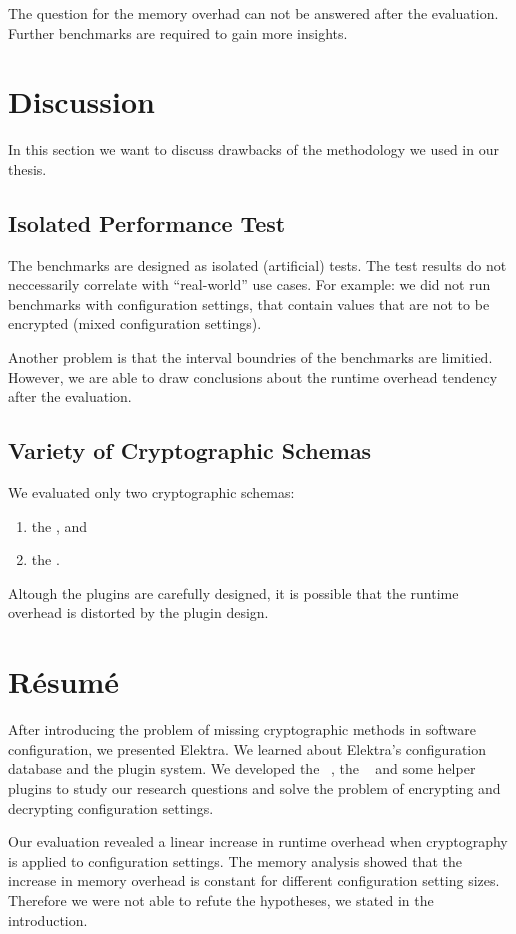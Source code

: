 The question for the memory overhad can not be answered after the evaluation.
Further benchmarks are required to gain more insights.

\section{Discussion}

In this section we want to discuss drawbacks of the methodology we used in our thesis.

	\subsection{Isolated Performance Test}

The benchmarks are designed as isolated (artificial) tests.
The test results do not neccessarily correlate with ``real-world'' use cases.
For example: we did not run benchmarks with configuration settings, that contain values that are not to be encrypted (mixed configuration settings).

Another problem is that the interval boundries of the benchmarks are limitied.
However, we are able to draw conclusions about the runtime overhead tendency after the evaluation.

	\subsection{Variety of Cryptographic Schemas}

We evaluated only two cryptographic schemas:
\begin{enumerate}
\item the \crypto, and
\item the \fcrypt.
\end{enumerate}

Altough the plugins are carefully designed, it is possible that the runtime overhead is distorted by the plugin design.

\section{Résumé}

After introducing the problem of missing cryptographic methods in software configuration, we presented Elektra.
We learned about Elektra's configuration database and the plugin system.
We developed the \crypto~, the \fcrypt~ and some helper plugins to study our research questions and solve the problem of encrypting and decrypting configuration settings.

Our evaluation revealed a linear increase in runtime overhead when cryptography is applied to configuration settings.
The memory analysis showed that the increase in memory overhead is constant for different configuration setting sizes.
Therefore we were not able to refute the hypotheses, we stated in the introduction.
